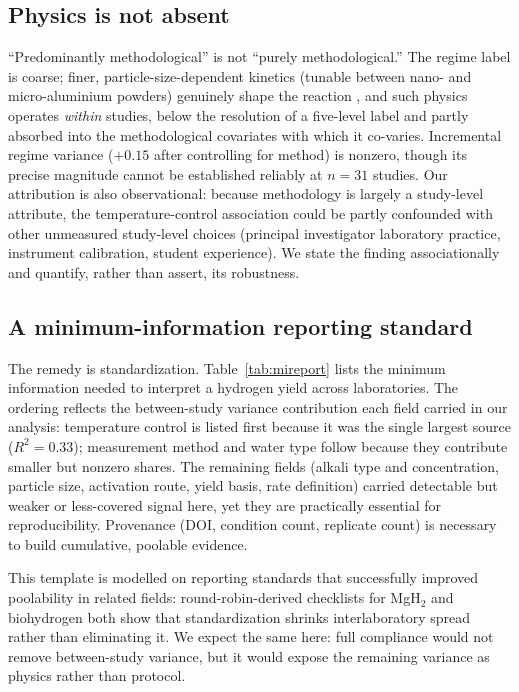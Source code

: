 \subsection{Physics is not absent}

``Predominantly methodological'' is not ``purely methodological.'' The regime label is
coarse; finer, particle-size-dependent kinetics (tunable between nano- and
micro-aluminium powders) genuinely shape the reaction \citep{saceleanu2019}, and such
physics operates \emph{within} studies, below the resolution of a five-level label and
partly absorbed into the methodological covariates with which it co-varies. Incremental
regime variance ($+0.15$ after controlling for method) is nonzero, though its precise
magnitude cannot be established reliably at $n\!=\!31$ studies.
Our attribution is also observational: because methodology is largely a study-level
attribute, the temperature-control association could be partly confounded with other
unmeasured study-level choices (principal investigator laboratory practice, instrument
calibration, student experience). We state the finding associationally and quantify,
rather than assert, its robustness.

\subsection{A minimum-information reporting standard}

The remedy is standardization. Table~\ref{tab:mireport} lists the minimum information
needed to interpret a hydrogen yield across laboratories. The ordering reflects the
between-study variance contribution each field carried in our analysis: temperature
control is listed first because it was the single largest source ($R^2\!=\!0.33$);
measurement method and water type follow because they contribute smaller but nonzero
shares. The remaining fields (alkali type and concentration, particle size, activation
route, yield basis, rate definition) carried detectable but weaker or less-covered
signal here, yet they are practically essential for reproducibility. Provenance (DOI,
condition count, replicate count) is necessary to build cumulative, poolable evidence.

This template is modelled on reporting standards that successfully improved poolability
in related fields: round-robin-derived checklists for MgH$_2$ \citep{wulf2021} and
biohydrogen \citep{hoque2018} both show that standardization shrinks interlaboratory
spread rather than eliminating it. We expect the same here: full compliance would not
remove between-study variance, but it would expose the remaining variance as physics
rather than protocol.

